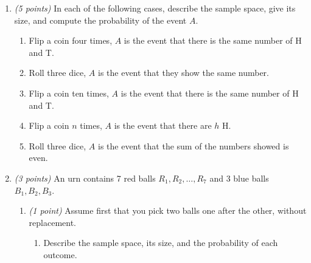 \documentclass[12pt]{article}
\begin{document}
\begin{enumerate}

\item \emph{(5 points)} In each of the following cases, describe the sample space, give its size, and compute the probability of the event \( A \).

\begin{enumerate}
\item Flip a coin four times, \( A \) is the event that there is the same number of H and T. \newline


\item Roll three dice, \( A \) is the event that they show the same number. \newline


\item Flip a coin ten times, \( A \) is the event that there is the same number of H and T. \newline


\item Flip a coin \( n \) times, \( A \) is the event that there are \( h \) H. \newline


\item Roll three dice, \( A \) is the event that the sum of the numbers showed is even. \newline

\end{enumerate}

\item \emph{(3 points)} An urn contains 7 red balls \( R_1, R_2, \dots, R_7 \) and 3 blue balls \( B_1, B_2, B_3 \).

\begin{enumerate}
\item \emph{(1 point)} Assume first that you pick two balls one after the other, without replacement.

\begin{enumerate}
\item Describe the sample space, its size, and the probability of each outcome. \newline


\end{enumerate}
\end{enumerate}
\end{enumerate}
\end{document}
